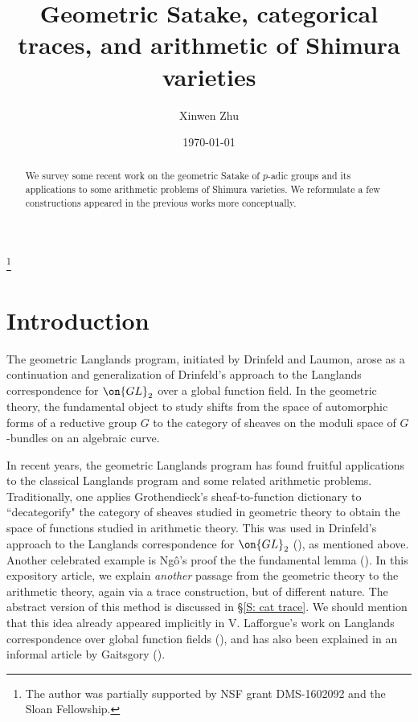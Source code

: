 \documentclass[11pt]{amsart}
\theoremstyle{definition}
\theoremstyle{definition}
\theoremstyle{definition}
\numberwithin{equation}{subsection}
\newcommand{\GL}{{\on{GL}}}
\begin{document}
\title{Geometric Satake, categorical traces, and arithmetic of Shimura varieties}
\author{Xinwen Zhu}
\address{Xinwen Zhu, Department of Mathematics, Caltech, 1200 East California Boulevard, Pasadena, CA 91125.}
\date{\today}
\thanks{
The author was partially supported by NSF grant DMS-1602092 and the Sloan Fellowship.}
\begin{abstract}
We survey some recent work on the geometric Satake of $p$-adic groups and its applications to some arithmetic problems of Shimura varieties. We reformulate a few constructions appeared in the previous works more conceptually. 
\end{abstract}
\date{}
\maketitle

\tableofcontents

\section{Introduction}
The geometric Langlands program, initiated by Drinfeld and Laumon, arose as a continuation and generalization of  Drinfeld's approach to the Langlands correspondence for $\GL_2$ over a global function field. In the geometric theory, the fundamental object to study shifts from the space of automorphic forms of a reductive group $G$ to the category of sheaves on the moduli space of $G$-bundles on an algebraic curve. 

In recent years, the geometric Langlands program has found fruitful applications to the classical Langlands program and some related arithmetic problems. Traditionally, one applies Grothendieck's sheaf-to-function dictionary to
``decategorify" the category of sheaves studied in geometric theory to obtain the space of functions studied in arithmetic theory. This was used in Drinfeld's approach to the Langlands correspondence for $\GL_2$ (\cite{Dr}), as mentioned above. Another celebrated example is Ng\^o's proof the the fundamental lemma (\cite{Ng}). 
In this expository article, we explain \emph{another} passage from the geometric theory to the arithmetic theory, again via a trace construction, but of different nature. The abstract version of this method is discussed in \S \ref{S: cat trace}. We should mention that this idea already appeared  implicitly in V. Lafforgue's work on Langlands correspondence over global function fields (\cite{La}), and has also been explained in an informal article by Gaitsgory (\cite{Ga}).
\end{document}
